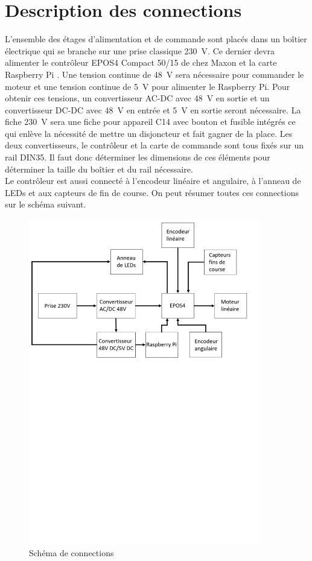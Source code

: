 \section{Description des connections}\label{sec:DescConnect}
L'ensemble des étages d'alimentation et de commande sont placés dans un boîtier électrique qui se branche sur une prise classique 230~V. Ce dernier
devra alimenter le contrôleur EPOS4 Compact 50/15 de chez Maxon \cite{Maxon} et la carte Raspberry Pi \cite{RaspberryPi}. Une tension continue de 48~V
sera nécessaire pour commander le moteur et une tension continue de 5~V pour alimenter le Raspberry Pi. Pour obtenir ces tensions,
un convertisseur AC-DC avec 48~V en sortie et un convertisseur DC-DC avec 48~V en entrée et 5~V en sortie seront nécessaire. La fiche 230~V
sera une fiche pour appareil C14 avec bouton et fusible intégrés ce qui enlève la nécessité de mettre un disjoncteur et fait gagner de la place. Les deux
convertisseurs, le contrôleur et la carte de commande sont tous fixés sur un rail DIN35. Il faut donc déterminer les dimensions de ces éléments pour
déterminer la taille du boîtier et du rail nécessaire.\\

Le contrôleur est aussi connecté à l'encodeur linéaire et angulaire, à l'anneau de LEDs et aux capteurs de fin de course. On peut résumer toutes
ces connections sur le schéma suivant.

\begin{figure}[H]
  \centering
  \includegraphics[width = 0.9\textwidth]{assets/figures/SchemaLogique.svg}
  \caption{Schéma de connections}
  \label{fig:SchemaConnec}
\end{figure}

